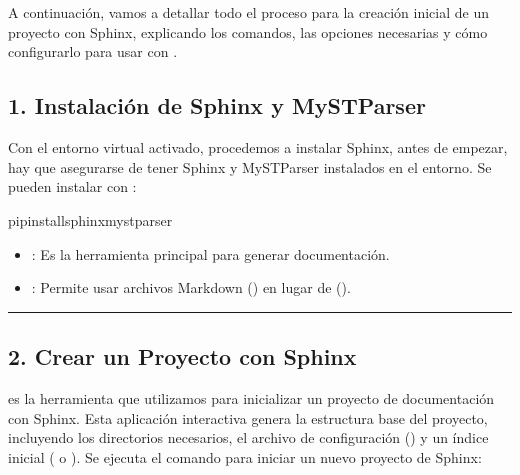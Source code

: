 \documentclass[a4paper,10pt,oneside,spanish,openany]{sphinxmanual}
\begin{document}
\sphinxstepscope


\section{}
\label{\detokenize{configuracion_inicial/003.Creacion_proyecto_Sphinx:creacion-inicial-del-proyecto-con-sphinx}}\label{\detokenize{configuracion_inicial/003.Creacion_proyecto_Sphinx::doc}}
\sphinxAtStartPar
A continuación, vamos a detallar todo el proceso para la creación inicial de un proyecto con Sphinx, explicando los comandos, las opciones necesarias y cómo configurarlo para usar  con .


\subsection{1. Instalación de Sphinx y MyST\sphinxhyphen{}Parser}
\label{\detokenize{configuracion_inicial/003.Creacion_proyecto_Sphinx:instalacion-de-sphinx-y-myst-parser}}
\sphinxAtStartPar
Con el entorno virtual activado, procedemos a instalar Sphinx, antes de empezar, hay que asegurarse de tener Sphinx y MyST\sphinxhyphen{}Parser instalados en el entorno. Se pueden instalar con :

\begin{sphinxVerbatim}[commandchars=\\\{\}]
pipinstallsphinxmyst\PYGZhy{}parser
\end{sphinxVerbatim}
\begin{itemize}
\item {} 
\sphinxAtStartPar
{}: Es la herramienta principal para generar documentación.

\item {} 
\sphinxAtStartPar
{}: Permite usar archivos Markdown () en lugar de  ().

\end{itemize}


\bigskip\hrule\bigskip



\subsection{2. Crear un Proyecto con Sphinx}
\label{\detokenize{configuracion_inicial/003.Creacion_proyecto_Sphinx:crear-un-proyecto-con-sphinx}}
\sphinxAtStartPar
{} es la herramienta que utilizamos para inicializar un proyecto de documentación con Sphinx.
Esta aplicación interactiva genera la estructura base del proyecto, incluyendo los directorios necesarios, el archivo de configuración () y un índice inicial ( o ).
Se ejecuta el comando para iniciar un nuevo proyecto de Sphinx:
\end{document}
